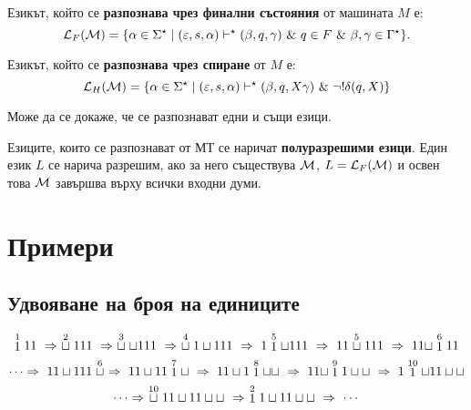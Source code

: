 Езикът, който се {\bf разпознава чрез финални състояния} от машината $M$ е:
\[\mathcal{L}_F(\mathcal{M}) = \{\alpha\in\Sigma^\star \mid (\varepsilon, s, \alpha) \vdash^\star (\beta, q, \gamma)\ \&\ q\in F\ \&\ \beta,\gamma\in\Gamma^\star\}.\]

Езикът, който се {\bf разпознава чрез спиране} от $M$ е:
\[\L_H(\M) = \{\alpha \in \Sigma^\star \mid (\varepsilon, s, \alpha) \vdash^\star (\beta, q, X\gamma)\ \&\ \neg !\delta(q,X)\}\]

Може да се докаже, че се разпознават едни и същи езици.

Езиците, които се разпознават от МТ се наричат {\bf полуразрешими езици}.
Един език $L$ се нарича разрешим, ако за него съществува $\mathcal{M}$, $L = \mathcal{L}_F(\mathcal{M})$
и освен това $\mathcal{M}$ завършва върху всички входни думи.

\section{Примери}

\subsection*{Удвояване на броя на единиците}

\[\stackrel{1}{1}11\ \Rightarrow\ \stackrel{2}{\blank} 111\ \Rightarrow\ \stackrel{3}{\blank}\blank 111\ \Rightarrow\ \stackrel{4}{\blank}1\blank 111\ \Rightarrow\ 1\stackrel{5}{1}\blank 111\ \Rightarrow\  11\stackrel{5}{\blank}111\ \Rightarrow\  11 \blank \stackrel{6}{1}11\]
\[\dots \Rightarrow\ 11\blank 111\stackrel{6}{\blank}\ \Rightarrow\ 11\blank 11\stackrel{7}{1}\blank\ \Rightarrow\ 11\blank 1\stackrel{8}{1}\blank\blank\ \Rightarrow\ 11\blank \stackrel{9}{1}1\blank\blank\ \Rightarrow\  1\stackrel{10}{1}\blank 11\blank\blank\]
\[\dots \Rightarrow\ \stackrel{10}{\blank}11\blank 11\blank\blank\ \Rightarrow\ \stackrel{2}{1}1\blank 11\blank\blank\ \Rightarrow\ \cdots\]

